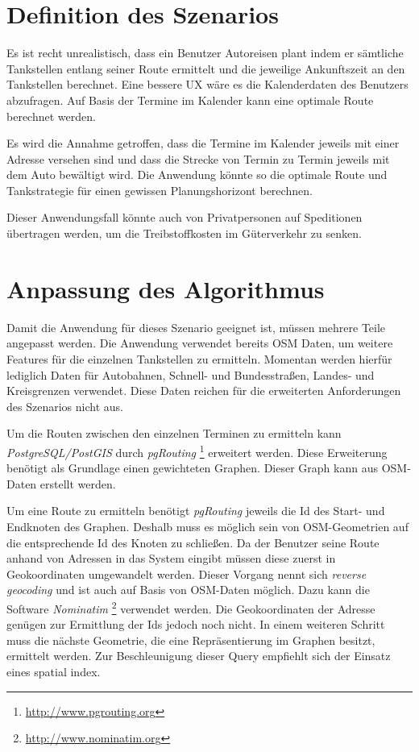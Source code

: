 \documentclass[
ngerman          %
,a4paper          %
,11pt
,pdftex
]{report}
\begin{document}
\section{Definition des Szenarios}
\label{sec:orge2ccbc7}
Es ist recht unrealistisch, dass ein Benutzer Autoreisen plant indem er sämtliche Tankstellen entlang seiner Route ermittelt und die jeweilige Ankunftszeit an den Tankstellen berechnet. Eine bessere \ac{UX} wäre es die Kalenderdaten des Benutzers abzufragen. Auf Basis der Termine im Kalender kann eine optimale Route berechnet werden.

Es wird die Annahme getroffen, dass die Termine im Kalender jeweils mit einer Adresse versehen sind und dass die Strecke von Termin zu Termin jeweils mit dem Auto bewältigt wird. Die Anwendung könnte so die optimale Route und Tankstrategie für einen gewissen Planungshorizont berechnen.

Dieser Anwendungsfall könnte auch von Privatpersonen auf Speditionen übertragen werden, um die Treibstoffkosten im Güterverkehr zu senken.

\section{Anpassung des Algorithmus}
\label{sec:org182565e}
Damit die Anwendung für dieses Szenario geeignet ist, müssen mehrere Teile angepasst werden. Die Anwendung verwendet bereits \ac{OSM} Daten, um weitere Features für die einzelnen Tankstellen zu ermitteln. Momentan werden hierfür lediglich Daten für Autobahnen, Schnell- und Bundesstraßen, Landes- und Kreisgrenzen verwendet. Diese Daten reichen für die erweiterten Anforderungen des Szenarios nicht aus.

Um die Routen zwischen den einzelnen Terminen zu ermitteln kann \emph{PostgreSQL/PostGIS} durch \emph{pgRouting} \footnote{\url{http://www.pgrouting.org}} erweitert werden. Diese Erweiterung benötigt als Grundlage einen gewichteten Graphen. Dieser Graph kann aus \ac{OSM}-Daten erstellt werden.

Um eine Route zu ermitteln benötigt \emph{pgRouting} jeweils die Id des Start- und Endknoten des Graphen. Deshalb muss es möglich sein von \ac{OSM}-Geometrien auf die entsprechende Id des Knoten zu schließen. Da der Benutzer seine Route anhand von Adressen in das System eingibt müssen diese zuerst in Geokoordinaten umgewandelt werden. Dieser Vorgang nennt sich \emph{reverse geocoding} und ist auch auf Basis von \ac{OSM}-Daten möglich. Dazu kann die Software \emph{Nominatim} \footnote{\url{http://www.nominatim.org}} verwendet werden. Die Geokoordinaten der Adresse genügen zur Ermittlung der Ids jedoch noch nicht. In einem weiteren Schritt muss die nächste Geometrie, die eine Repräsentierung im Graphen besitzt, ermittelt werden. Zur Beschleunigung dieser Query empfiehlt sich der Einsatz eines spatial index.
\end{document}

